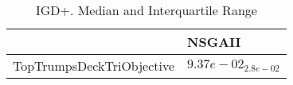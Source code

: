 \documentclass{article}
\begin{document}
\begin{table}
\caption{IGD+. Median and Interquartile Range}
\label{table: IGD+}
\centering
\begin{scriptsize}
\begin{tabular}{ll}
\hline &  NSGAII\\
\hline 
TopTrumpsDeckTriObjective & \cellcolor{gray95}$  9.37e-02_{ 2.8e-02}$ \\
\hline
\end{tabular}
\end{scriptsize}
\end{table}
\end{document}
